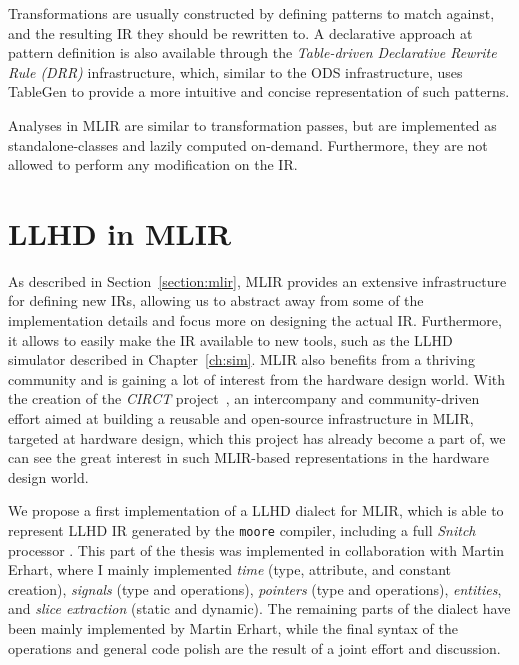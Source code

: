 Transformations are usually constructed by defining patterns to match against, and the resulting IR they should be rewritten to. A declarative approach at pattern definition is also available through the \textit{Table-driven Declarative Rewrite Rule (DRR)} infrastructure, which, similar to the ODS infrastructure, uses TableGen to provide a more intuitive and concise representation of such patterns.

Analyses in MLIR are similar to transformation passes, but are implemented as standalone-classes and lazily computed on-demand. Furthermore, they are not allowed to perform any modification on the IR.


\section{LLHD in MLIR}
\label{section:llhdmlir}
As described in Section~\ref{section:mlir}, MLIR provides an extensive infrastructure for defining new IRs, allowing us to abstract away from some of the implementation details and focus more on designing the actual IR. Furthermore, it allows to easily make the IR available to new tools, such as the LLHD simulator described in Chapter~\ref{ch:sim}. MLIR also benefits from a thriving community and is gaining a lot of interest from the hardware design world. With the creation of the \textit{CIRCT} project~\cite{circt}, an intercompany and community-driven effort aimed at building a reusable and open-source infrastructure in MLIR, targeted at hardware design, which this project has already become a part of, we can see the great interest in such MLIR-based representations in the hardware design world.

We propose a first implementation of a LLHD dialect for MLIR, which is able to represent LLHD IR generated by the \texttt{moore} compiler, including a full \textit{Snitch} processor \cite{Zaruba2020}. This part of the thesis was implemented in collaboration with Martin Erhart, where I mainly implemented \textit{time} (type, attribute, and constant creation), \textit{signals} (type and operations), \textit{pointers} (type and operations), \textit{entities}, and \textit{slice extraction} (static and dynamic). The remaining parts of the dialect have been mainly implemented by Martin Erhart, while the final syntax of the operations and general code polish are the result of a joint effort and discussion.


